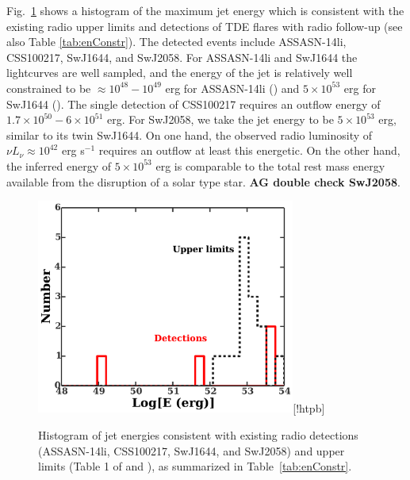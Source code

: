 \documentclass[usenatbib,fleqn]{mnras}
\begin{document}
Fig.~\ref{fig:hist} shows a histogram of the maximum jet energy which
is consistent with the existing radio upper limits and detections of
TDE flares with radio follow-up (see also Table \ref{tab:enConstr}).
The detected events include ASSASN-14li, CSS100217, SwJ1644, and
SwJ2058.  For ASSASN-14li and SwJ1644 the lightcurves are well
sampled, and the energy of the jet is relatively well constrained to
be $\approx 10^{48}-10^{49}$ erg for ASSASN-14li
(\citealt{van-Velzen+2015, Alexander+2015}) and $5\times 10^{53}$ erg
for SwJ1644 (\citealt{Mimica+2015}).  The single detection of
CSS100217 requires an outflow energy of $1.7\times 10^{50}-6\times
10^{51}$ erg.  For SwJ2058, we take the jet energy to be $5\times
10^{53}$ erg, similar to its twin SwJ1644.  On one hand, the observed
radio luminosity of $\nu L_{\nu }\approx 10^{42}$ erg s$^{-1}$
\citep{Cenko+2012} requires an outflow at least this energetic.  On
the other hand, the inferred energy of $5\times 10^{53}$ erg is
comparable to the total rest mass energy available from the disruption
of a solar type star. {\bf AG double check SwJ2058}.

\begin{figure}
\includegraphics[width=8.5cm]{hist.pdf}[!htpb]
\caption{\label{fig:hist} Histogram of jet energies consistent with
  existing radio detections (ASSASN-14li, CSS100217, SwJ1644, and
  SwJ2058) and upper limits (Table 1 of \citealt{Mimica+2015} and
  \citealt{Arcavi+2014}), as summarized in Table~\ref{tab:enConstr}.}
\end{figure}
\end{document}
